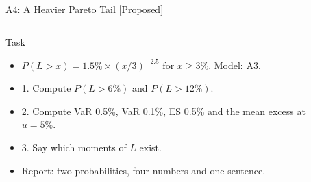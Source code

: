 \begin{frame}{A4: A Heavier Pareto Tail [Proposed]}
\propsub
\itemsize{\scriptsize}
\begin{columns}[T]
\begin{column}{\taskw}
\begin{block}{Task}
\begin{itemize}
    \item $P(L > x) = 1.5\% \times (x/3)^{-2.5}$ for $x \ge 3\%$. Model: A3.
    \item 1. Compute $P(L > 6\%)$ and $P(L > 12\%)$.
    \item 2. Compute VaR 0.5\%, VaR 0.1\%, ES 0.5\% and the mean excess at $u = 5\%$.
    \item 3. Say which moments of $L$ exist.
    \item Report: two probabilities, four numbers and one sentence.
\end{itemize}
\end{block}
\end{column}
\begin{column}{\solw}
\end{column}
\end{columns}
\end{frame}

